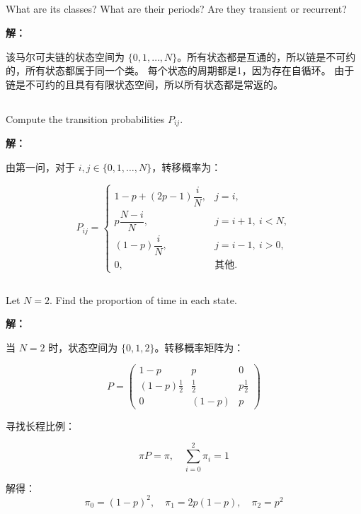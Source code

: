 \documentclass[12pt,a4paper]{article}
\begin{document}
\subsection{}

What are its classes? What are their periods? Are they transient or recurrent?

\begin{answerbox}
\textbf{解：}

该马尔可夫链的状态空间为 $\{0, 1, \ldots, N\}$。所有状态都是互通的，所以链是不可约的，所有状态都属于同一个类。
每个状态的周期都是1，因为存在自循环。
由于链是不可约的且具有有限状态空间，所以所有状态都是常返的。
\end{answerbox}


\subsection{}

Compute the transition probabilities $P_{ij}$.

\begin{answerbox}
\textbf{解：}

由第一问，对于 $i,j\in\{0,1,\ldots,N\}$，转移概率为：

$$
P_{ij}=\begin{cases}
  1-p+(2p-1)\dfrac{i}{N}, & j=i, \\
  p\dfrac{N-i}{N}, & j=i+1,\ i<N, \\
  (1-p)\dfrac{i}{N}, & j=i-1,\ i>0, \\
  0, & \text{其他}.
\end{cases}
$$

\end{answerbox}

\subsection{}

Let $N = 2$. Find the proportion of time in each state.

\begin{answerbox}
\textbf{解：}

当 $N = 2$ 时，状态空间为 $\{0, 1, 2\}$。转移概率矩阵为：

$$
P=\begin{pmatrix}
  1-p & p & 0 \\
  (1-p)\frac{1}{2} & \frac{1}{2} & p\frac{1}{2} \\
  0 & (1-p) & p
\end{pmatrix}
$$

寻找长程比例：

$$
\pi P = \pi, \quad \sum_{i=0}^{2} \pi_i = 1
$$

解得：
$$
\pi_0 = (1-p)^2, \quad
\pi_1 = 2p(1-p), \quad
\pi_2 = p^2
$$
\end{answerbox}
\end{document}
